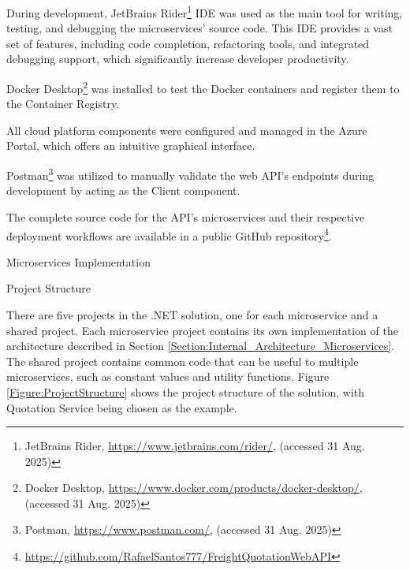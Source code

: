 \documentclass[12pt, reqno, oneside]{amsbook}
\makeatletter
\def\section{\@startsection{section}{1}%
      \z@{.5\linespacing\@plus.7\linespacing}{.25\linespacing}%
      {\normalfont\bfseries\flushleft}}
\def\subsection{\@startsection{subsection}{2}%
      \z@{.5\linespacing\@plus.7\linespacing}{.25\linespacing}%
      {\normalfont\bfseries\flushleft}}
\theoremstyle{definition}
\theoremstyle{definition}
\numberwithin{section}{chapter}
\numberwithin{table}{chapter}
\numberwithin{figure}{chapter}
\makeatother
\begin{document}
During development, JetBrains Rider\footnote{JetBrains Rider, \url{https://www.jetbrains.com/rider/}, (accessed 31 Aug. 2025)} \ac{IDE} was used as the main tool for writing, testing, and debugging the microservices' source code. This \ac{IDE} provides a vast set of features, including code completion, refactoring tools, and integrated debugging support, which significantly increase developer productivity.

Docker Desktop\footnote{Docker Desktop, \url{https://www.docker.com/products/docker-desktop/}, (accessed 31 Aug. 2025)} was installed to test the Docker containers and register them to the Container Registry.

All cloud platform components were configured and managed in the Azure Portal, which offers an intuitive graphical interface.

Postman\footnote{Postman, \url{https://www.postman.com/}, (accessed 31 Aug. 2025)} was utilized to manually validate the web \ac{API}'s endpoints during development by acting as the Client component.

The complete source code for the \ac{API}'s microservices and their respective deployment workflows are available in a public GitHub repository\footnote{\url{https://github.com/RafaelSantos777/FreightQuotationWebAPI}}.

\pagebreak

\section{Microservices Implementation}
\label{Section:Microservices_Implementation}

\subsection{Project Structure}

There are five projects in the .NET solution, one for each microservice and a shared project. Each microservice project contains its own implementation of the architecture described in Section \ref{Section:Internal_Architecture_Microservices}. The shared project contains common code that can be useful to multiple microservices, such as constant values and utility functions.
Figure \ref{Figure:ProjectStructure} shows the project structure of the solution, with Quotation Service being chosen as the example.
\end{document}
